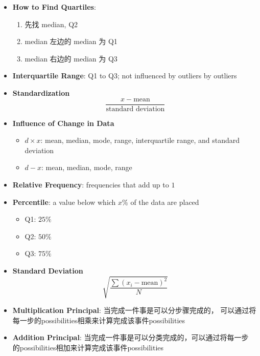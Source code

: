 \begin{multicols}{2}
\begin{itemize}
    \item \textbf{How to Find Quartiles}:
    \begin{enumerate}
      \item 先找 median, Q2
      \item median 左边的 median 为 Q1
      \item median 右边的 median 为 Q3
    \end{enumerate}

    \item \textbf{Interquartile Range}: Q1 to Q3; not influenced by outliers
    by outliers

    \item \textbf{Standardization}
    \begin{equation}
      \frac{x - \text{mean}}{\text{standard deviation}}
    \end{equation}

    \item \textbf{Influence of Change in Data}
    \begin{itemize}
      \item $ d \times x $: mean, median, mode, range, interquartile range,
      and standard deviation
      \item $ d - x $: mean, median, mode, range
    \end{itemize}

    \item \textbf{Relative Frequency}: frequencies that add up to $ 1 $
    \item \textbf{Percentile}: a value below which $ x \% $ of the data are
    placed
    \begin{itemize}
      \item Q1: $ 25\% $
      \item Q2: $ 50\% $
      \item Q3: $ 75\% $
    \end{itemize}

    \item \textbf{Standard Deviation}
    \begin{equation}
      \sqrt{\frac{\sum \left( x_{i} - \text{mean} \right)^{2}}{N}}
    \end{equation}

    \item \textbf{Multiplication Principal}: 当完成一件事是可以分步骤完成的，
    可以通过将每一步的possibilities相乘来计算完成该事件possibilities
    \item \textbf{Addition Principal}: 当完成一件事是可以分类完成的，可以通过将每一步
    的possibilities相加来计算完成该事件possibilities


\end{itemize}
\end{multicols}
